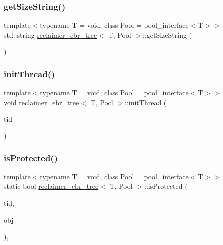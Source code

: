 \subsubsection{\texorpdfstring{get\+Size\+String()}{getSizeString()}}
{\footnotesize\ttfamily template$<$typename T  = void, class Pool  = pool\+\_\+interface$<$\+T$>$$>$ \\
std\+::string \hyperlink{classreclaimer__ebr__tree}{reclaimer\+\_\+ebr\+\_\+tree}$<$ T, Pool $>$\+::get\+Size\+String (\begin{DoxyParamCaption}{ }\end{DoxyParamCaption})\hspace{0.3cm}{\ttfamily [inline]}}

\mbox{\label{classreclaimer__ebr__tree_a8010c52193245d2bbc14039afc1a4b19}} 
\subsubsection{\texorpdfstring{init\+Thread()}{initThread()}}
{\footnotesize\ttfamily template$<$typename T  = void, class Pool  = pool\+\_\+interface$<$\+T$>$$>$ \\
void \hyperlink{classreclaimer__ebr__tree}{reclaimer\+\_\+ebr\+\_\+tree}$<$ T, Pool $>$\+::init\+Thread (\begin{DoxyParamCaption}\item[{const int}]{tid }\end{DoxyParamCaption})\hspace{0.3cm}{\ttfamily [inline]}}

\mbox{\label{classreclaimer__ebr__tree_a10902145ffb73e322be25a61a735eba3}} 
\subsubsection{\texorpdfstring{is\+Protected()}{isProtected()}}
{\footnotesize\ttfamily template$<$typename T  = void, class Pool  = pool\+\_\+interface$<$\+T$>$$>$ \\
static bool \hyperlink{classreclaimer__ebr__tree}{reclaimer\+\_\+ebr\+\_\+tree}$<$ T, Pool $>$\+::is\+Protected (\begin{DoxyParamCaption}\item[{const int}]{tid,  }\item[{T $\ast$const}]{obj }\end{DoxyParamCaption})\hspace{0.3cm}{\ttfamily [inline]}, {\ttfamily [static]}}


